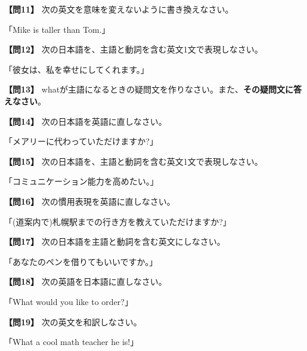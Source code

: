 \testqsep
\testquestion
\noindent\textbf{【問11】} 次の英文を意味を変えないように書き換えなさい。

\noindent「Mike is taller than Tom.」

\testqsep
\testquestion
\noindent\textbf{【問12】} 次の日本語を、主語と動詞を含む英文1文で表現しなさい。

\noindent「彼女は、私を幸せにしてくれます。」

\testqsep
\testquestion
\noindent\textbf{【問13】} whatが主語になるときの疑問文を作りなさい。また、\textbf{その疑問文に答えなさい}。

\vspace{0.5em}
\testqsep
\testquestion
\noindent\textbf{【問14】} 次の日本語を英語に直しなさい。

\noindent「メアリーに代わっていただけますか?」

\testqsep
\testquestion
\noindent\textbf{【問15】} 次の日本語を、主語と動詞を含む英文1文で表現しなさい。

\noindent「コミュニケーション能力を高めたい。」

\testqsep

\newpage
\testquestion
\noindent\textbf{【問16】} 次の慣用表現を英語に直しなさい。

\noindent「(道案内で)札幌駅までの行き方を教えていただけますか?」

\testqsep
\testquestion
\noindent\textbf{【問17】} 次の日本語を主語と動詞を含む英文にしなさい。

\noindent「あなたのペンを借りてもいいですか。」

\testqsep
\testquestion
\noindent\textbf{【問18】} 次の英語を日本語に直しなさい。

\noindent「What would you like to order?」

\testqsep
\testquestion
\noindent\textbf{【問19】} 次の英文を和訳しなさい。

\noindent「What a cool math teacher he is!」

\testqsep

